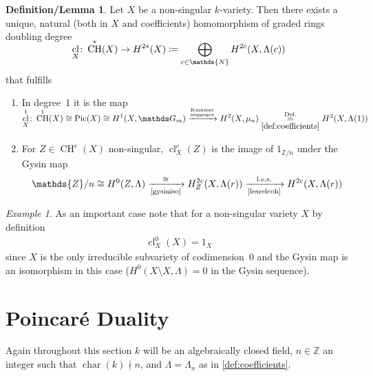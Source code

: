 \documentclass[english,headsepline=0.25pt]{scrartcl}
\theoremstyle{definition}
\newtheorem{DefLem}[Def]{Definition/Lemma}
\theoremstyle{remark}
\newtheorem{Ex}[Def]{Example}
\newcommand*{\N}{\mathds{N}}
\newcommand*{\Z}{\mathds{Z}}
\newcommand*{\Zmod}[1]{\Z/#1} %
\DeclareMathOperator{\Char}{char} %
\DeclareMathOperator{\CH}{CH} %
\DeclareMathOperator{\Pic}{Pic} %
\DeclareMathOperator{\CL}{cl} %
\newcommand*{\one}[1]{{1_{#1}}}%
\begin{document}
\begin{DefLem}\label{def:cycleclassmap}
  Let $X$ be a non-singular $k$-variety.
  Then there exists a unique, natural (both in $X$ and coefficients)
  homomorphism of graded rings doubling degree
  \begin{gather*}
    \SwapAboveDisplaySkip
    \CL_X\colon \CH^*(X)\rightarrow H^{2*}(X)\coloneqq
    \bigoplus_{c\in\N} H^{2c}(X,\Lambda(c))
  \end{gather*}
  that fulfills
  \begin{enumerate}
  \item In degree~1 it is the map
    \begin{gather*}
      \SwapAboveDisplaySkip
      \CL_X^1\colon
      \CH^1(X)\cong \Pic(X)\cong H^1(X,\mathds G_m)
      \xrightarrow{\small \substack{\text{Kummer}\\\text{sequence}}}
      H^2(X,\mu_n)
      \overset{\text{Def.}}{\underset{\ref{def:coefficients}}{=}}
      H^2(X,\Lambda(1))
    \end{gather*}
  \item For $Z\in\CH^c(X)$ non-singular, $\CL_X^c(Z)$ is the image of
    $1_{\Zmod{n}}$ under the Gysin map
    \begin{gather*}
      \Zmod{n} \cong H^0(Z,\Lambda)
      \xrightarrow[\text{\ref{gysiniso}}]{\cong}
      H_Z^{2c}(X,\Lambda(r))
      \xrightarrow[\text{\ref{lesrelcoh}}]{\text{l.e.s.}}
      H^{2c}(X,\Lambda(r))
    \end{gather*}
  \end{enumerate}
\end{DefLem}

\begin{Ex}\label{ex:clxx}
  As an important case note that for a non-singular variety $X$
  by definition
  \begin{gather*}
    \CL_{X}^0(X)=\one{X}
  \end{gather*}
  since $X$ is the only irreducible
  subvariety of codimension~$0$ and the Gysin map is an isomorphism in
  this case ($H^0(X\setminus X,\Lambda)=0$ in the Gysin
  sequence).
\end{Ex}

\section{Poincaré Duality}
Again throughout this section $k$ will be an algebraically closed field,
$n\in\Z$ an integer such that $\Char(k)\nmid n$,
and $\Lambda=\Lambda_n$ as in \ref{def:coefficients}.
\end{document}
